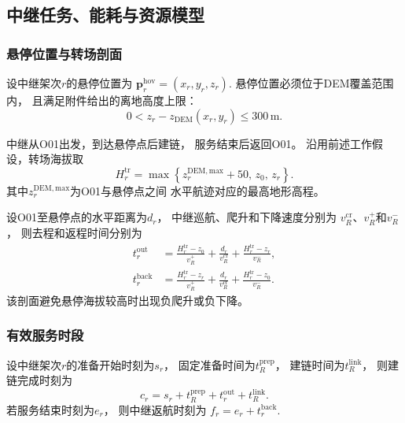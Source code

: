 \documentclass[bwprint]{gmcmthesis}
\begin{document}
\subsection{中继任务、能耗与资源模型}

\subsubsection{悬停位置与转场剖面}

设中继架次$r$的悬停位置为
\(\boldsymbol{p}_r^{\mathrm{hov}} = (x_r,y_r,z_r)\).
悬停位置必须位于DEM覆盖范围内，
且满足附件给出的离地高度上限：
\begin{equation}
    0<
    z_r-z_{\mathrm{DEM}}(x_r,y_r)
    \leq300\,\mathrm{m}.
\end{equation}

中继从O01出发，到达悬停点后建链，
服务结束后返回O01。
沿用前述工作假设，转场海拔取
\begin{equation}
    H_r^{\mathrm{tr}}
    =
    \max\left\{
    z_r^{\mathrm{DEM,max}}+50,\,
    z_0,\,
    z_r
    \right\}.
\end{equation}
其中$z_r^{\mathrm{DEM,max}}$为O01与悬停点之间
水平航迹对应的最高地形高程。

设O01至悬停点的水平距离为$d_r$，
中继巡航、爬升和下降速度分别为
$v_R^{\mathrm{cr}}$、$v_R^{+}$和$v_R^{-}$，
则去程和返程时间分别为
\begin{align}
    t_r^{\mathrm{out}}
    &=
    \frac{H_r^{\mathrm{tr}}-z_0}{v_R^{+}}
    +\frac{d_r}{v_R^{\mathrm{cr}}}
    +\frac{H_r^{\mathrm{tr}}-z_r}{v_R^{-}},\\
    t_r^{\mathrm{back}}
    &=
    \frac{H_r^{\mathrm{tr}}-z_r}{v_R^{+}}
    +\frac{d_r}{v_R^{\mathrm{cr}}}
    +\frac{H_r^{\mathrm{tr}}-z_0}{v_R^{-}}.
\end{align}
该剖面避免悬停海拔较高时出现负爬升或负下降。

\subsubsection{有效服务时段}

设中继架次$r$的准备开始时刻为$s_r$，
固定准备时间为$t_R^{\mathrm{prep}}$，
建链时间为$t_R^{\mathrm{link}}$，
则建链完成时刻为
\begin{equation}
    c_r
    =
    s_r+t_R^{\mathrm{prep}}
    +t_r^{\mathrm{out}}
    +t_R^{\mathrm{link}}.
\end{equation}
若服务结束时刻为$e_r$，
则中继返航时刻为
\(f_r=e_r+t_r^{\mathrm{back}}\).
\end{document}
